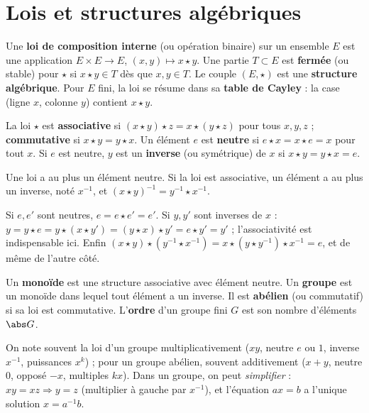 \section{Lois et structures algébriques}
\begin{definition}
Une \textbf{loi de composition interne} (ou opération binaire) sur un ensemble $E$ est une application $E\times E\to E$, $(x,y)\mapsto x\star y$. Une partie $T\subset E$ est \textbf{fermée} (ou stable) pour $\star$ si $x\star y\in T$ dès que $x,y\in T$. Le couple $(E,\star)$ est une \textbf{structure algébrique}. Pour $E$ fini, la loi se résume dans sa \textbf{table de Cayley} : la case (ligne $x$, colonne $y$) contient $x\star y$.
\end{definition}
\begin{definition}
La loi $\star$ est \textbf{associative} si $(x\star y)\star z=x\star(y\star z)$ pour tous $x,y,z$ ; \textbf{commutative} si $x\star y=y\star x$. Un élément $e$ est \textbf{neutre} si $e\star x=x\star e=x$ pour tout $x$. Si $e$ est neutre, $y$ est un \textbf{inverse} (ou symétrique) de $x$ si $x\star y=y\star x=e$.
\end{definition}
\begin{proposition}[Unicités]\label{prop-unicite-neutre}
Une loi a au plus un élément neutre. Si la loi est associative, un élément a au plus un inverse, noté $x^{-1}$, et $(x\star y)^{-1}=y^{-1}\star x^{-1}$.
\end{proposition}
\begin{preuve}
Si $e,e'$ sont neutres, $e=e\star e'=e'$. Si $y,y'$ sont inverses de $x$ : $y=y\star e=y\star(x\star y')=(y\star x)\star y'=e\star y'=y'$ ; l'associativité est indispensable ici. Enfin $(x\star y)\star(y^{-1}\star x^{-1})=x\star(y\star y^{-1})\star x^{-1}=e$, et de même de l'autre côté.
\end{preuve}
\begin{definition}\label{def-groupe}
Un \textbf{monoïde} est une structure associative avec élément neutre. Un \textbf{groupe} est un monoïde dans lequel tout élément a un inverse. Il est \textbf{abélien} (ou commutatif) si sa loi est commutative. L'\textbf{ordre} d'un groupe fini $G$ est son nombre d'éléments $\abs G$.
\end{definition}
\begin{remarque}[Notations]
On note souvent la loi d'un groupe multiplicativement ($xy$, neutre $e$ ou $1$, inverse $x^{-1}$, puissances $x^k$) ; pour un groupe abélien, souvent additivement ($x+y$, neutre $0$, opposé $-x$, multiples $kx$). Dans un groupe, on peut \emph{simplifier} : $xy=xz\Rightarrow y=z$ (multiplier à gauche par $x^{-1}$), et l'équation $ax=b$ a l'unique solution $x=a^{-1}b$.
\end{remarque}
